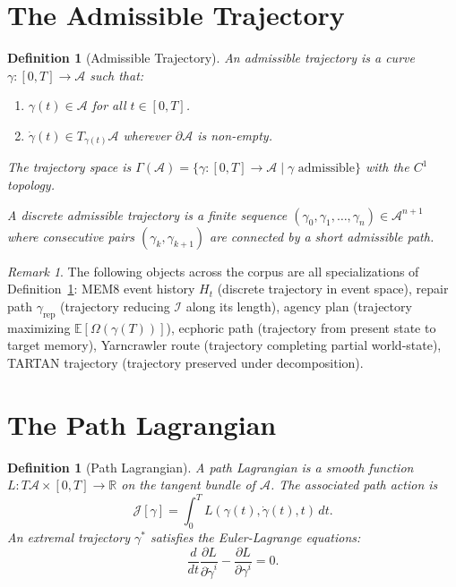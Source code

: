 \documentclass[11pt, a4paper]{book}
\theoremstyle{flyxion}
\newtheorem{definition}[theorem]{Definition}
\theoremstyle{remark}
\newtheorem{remark}[theorem]{Remark}
\begin{document}
\section{The Admissible Trajectory}

\begin{definition}[Admissible Trajectory]
\label{def:traj}
An \emph{admissible trajectory} is a curve
$\gamma: [0,T] \to \mathcal{A}$ such that:
\begin{enumerate}
\item $\gamma(t) \in \mathcal{A}$ for all $t \in [0,T]$.
\item $\dot\gamma(t) \in T_{\gamma(t)}\mathcal{A}$ wherever
  $\partial\mathcal{A}$ is non-empty.
\end{enumerate}
The \emph{trajectory space} is $\Gamma(\mathcal{A}) = \{\gamma:
[0,T] \to \mathcal{A} \mid \gamma\text{ admissible}\}$ with the
$C^1$ topology.

A \emph{discrete admissible trajectory} is a finite sequence
$(\gamma_0, \gamma_1, \ldots, \gamma_n) \in \mathcal{A}^{n+1}$
where consecutive pairs $(\gamma_k, \gamma_{k+1})$ are connected
by a short admissible path.
\end{definition}

\begin{remark}
The following objects across the corpus are all specializations
of Definition~\ref{def:traj}: MEM\textbar{}8 event history $H_t$
(discrete trajectory in event space), repair path $\gamma_\mathrm{rep}$
(trajectory reducing $\mathcal{I}$ along its length), agency plan
(trajectory maximizing $\mathbb{E}[\Omega(\gamma(T))]$),
ecphoric path (trajectory from present state to target memory),
Yarncrawler route (trajectory completing partial world-state),
TARTAN trajectory (trajectory preserved under decomposition).
\end{remark}

\section{The Path Lagrangian}

\begin{definition}[Path Lagrangian]
A \emph{path Lagrangian} is a smooth function
$L: T\mathcal{A} \times [0,T] \to \mathbb{R}$
on the tangent bundle of $\mathcal{A}$. The associated
\emph{path action} is
\[
\mathcal{J}[\gamma] = \int_0^T L(\gamma(t), \dot\gamma(t), t)\, dt.
\]
An \emph{extremal trajectory} $\gamma^*$ satisfies the
Euler-Lagrange equations:
\[
\frac{d}{dt}\frac{\partial L}{\partial \dot\gamma^i}
- \frac{\partial L}{\partial \gamma^i} = 0.
\]
\end{definition}
\end{document}
